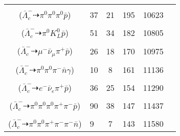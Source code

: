 \documentclass[landscape]{article}
\newcounter{rownumbers}
\newcommand\rn{\stepcounter{rownumbers}\arabic{rownumbers}}
\newcommand{\EOL}{\\} %
\newcommand{\topoTags}[1]{#1} %
\begin{document}
\begin{longtable}{clcccc}
\rn & \makecell[l]{ $ 
\bar{\Lambda}_{c}^{-} \rightarrow \pi^{0} \pi^{0} \bar{\Sigma}^{-} ,
\bar{\Sigma}^{-} \rightarrow \pi^{0} \bar{p} 
$ \\ ($
\bar{\Lambda}_{c}^{-} \dashrightarrow \pi^{0} \pi^{0} \pi^{0} \bar{p} 
$) } & \topoTags{37 & 21 & }195 & 10623 \EOL

\rn & \makecell[l]{ $ 
\bar{\Lambda}_{c}^{-} \rightarrow \pi^{0} K^{0} \bar{p} ,
K^{0} \rightarrow K_{L}^{0} 
$ \\ ($
\bar{\Lambda}_{c}^{-} \dashrightarrow \pi^{0} K_{L}^{0} \bar{p} 
$) } & \topoTags{51 & 34 & }182 & 10805 \EOL

\rn & \makecell[l]{ $ 
\bar{\Lambda}_{c}^{-} \rightarrow \mu^{-} \bar{\nu}_{\mu} \bar{\Lambda} ,
\bar{\Lambda} \rightarrow \pi^{+} \bar{p} 
$ \\ ($
\bar{\Lambda}_{c}^{-} \dashrightarrow \mu^{-} \bar{\nu}_{\mu} \pi^{+} \bar{p} 
$) } & \topoTags{26 & 18 & }170 & 10975 \EOL

\rn & \makecell[l]{ $ 
\bar{\Lambda}_{c}^{-} \rightarrow \pi^{0} \pi^{-} \bar{\Sigma}^{0} ,
\bar{\Sigma}^{0} \rightarrow \bar{\Lambda} \gamma ,
\bar{\Lambda} \rightarrow \pi^{0} \bar{n} 
$ \\ ($
\bar{\Lambda}_{c}^{-} \dashrightarrow \pi^{0} \pi^{0} \pi^{-} \bar{n} \gamma 
$) } & \topoTags{10 & 8 & }161 & 11136 \EOL

\rn & \makecell[l]{ $ 
\bar{\Lambda}_{c}^{-} \rightarrow e^{-} \bar{\nu}_{e} \bar{\Lambda} ,
\bar{\Lambda} \rightarrow \pi^{+} \bar{p} 
$ \\ ($
\bar{\Lambda}_{c}^{-} \dashrightarrow e^{-} \bar{\nu}_{e} \pi^{+} \bar{p} 
$) } & \topoTags{36 & 25 & }154 & 11290 \EOL

\rn & \makecell[l]{ $ 
\bar{\Lambda}_{c}^{-} \rightarrow \pi^{-} \eta \bar{\Lambda} ,
\eta \rightarrow \pi^{0} \pi^{0} \pi^{0} ,
\bar{\Lambda} \rightarrow \pi^{+} \bar{p} 
$ \\ ($
\bar{\Lambda}_{c}^{-} \dashrightarrow \pi^{0} \pi^{0} \pi^{0} \pi^{+} \pi^{-} \bar{p} 
$) } & \topoTags{90 & 38 & }147 & 11437 \EOL

\rn & \makecell[l]{ $ 
\bar{\Lambda}_{c}^{-} \rightarrow \pi^{-} \omega \bar{\Lambda} ,
\omega \rightarrow \pi^{0} \pi^{+} \pi^{-} ,
\bar{\Lambda} \rightarrow \pi^{0} \bar{n} 
$ \\ ($
\bar{\Lambda}_{c}^{-} \dashrightarrow \pi^{0} \pi^{0} \pi^{+} \pi^{-} \pi^{-} \bar{n} 
$) } & \topoTags{9 & 7 & }143 & 11580 \EOL


\end{longtable}
\end{document}
